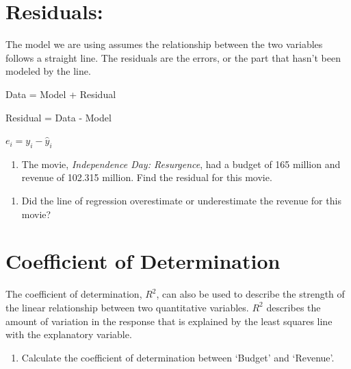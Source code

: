 \documentclass[
]{report}
\providecommand{\tightlist}{%
  \setlength{\itemsep}{0pt}\setlength{\parskip}{0pt}}
\begin{document}
\vspace{1in}

\hypertarget{residuals}{%
\section{Residuals:}\label{residuals}}

The model we are using assumes the relationship between the two variables follows a straight line. The residuals are the errors, or the part that hasn't been modeled by the line.

\begin{center}
Data = Model + Residual

Residual = Data - Model

$e_i=y_i-\hat{y}_i$
\end{center}

\begin{enumerate}
\def\labelenumi{\arabic{enumi}.}
\setcounter{enumi}{12}
\tightlist
\item
  The movie, \emph{Independence Day: Resurgence}, had a budget of 165 million and revenue of 102.315 million. Find the residual for this movie.
\end{enumerate}

\vspace{1in}

\begin{enumerate}
\def\labelenumi{\arabic{enumi}.}
\setcounter{enumi}{13}
\tightlist
\item
  Did the line of regression overestimate or underestimate the revenue for this movie?
\end{enumerate}

\vspace{1in}

\hypertarget{coefficient-of-determination}{%
\section{Coefficient of Determination}\label{coefficient-of-determination}}

The coefficient of determination, \(R^2\), can also be used to describe the strength of the linear relationship between two quantitative variables. \(R^2\) describes the amount of variation in the response that is explained by the least squares line with the explanatory variable.

\begin{enumerate}
\def\labelenumi{\arabic{enumi}.}
\setcounter{enumi}{14}
\tightlist
\item
  Calculate the coefficient of determination between `Budget' and `Revenue'.
\end{enumerate}
\end{document}
